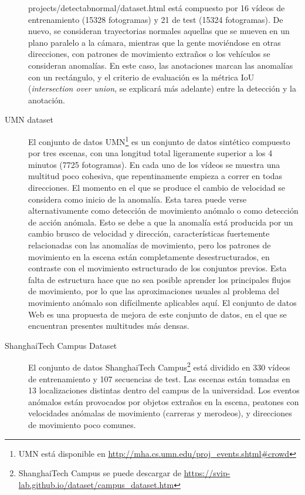 \documentclass[../main.tex]{memoir}
\begin{document}
\begin{description}
{{      projects/detectabnormal/dataset.html}} \cite{lu2013abnormal}
  está compuesto por 16 vídeos de entrenamiento (15328 fotogramas) y
  21 de test (15324 fotogramas). De nuevo, se consideran trayectorias
  normales aquellas que se mueven en un plano paralelo a la cámara,
  mientras que la gente moviéndose en otras direcciones, con patrones
  de movimiento extraños o los vehículos se consideran anomalías. En
  este caso, las anotaciones marcan las anomalías con un rectángulo, y
  el criterio de evaluación es la métrica IoU (\textit{intersection
    over union}, se explicará más adelante) entre la detección y la
  anotación.
\item[UMN dataset] El conjunto de datos UMN\footnote{UMN está
    disponible en \url{http://mha.cs.umn.edu/proj\_events.shtml\#crowd}}
  es un conjunto de datos sintético compuesto por tres escenas, con
  una longitud total ligeramente superior a los 4 minutos (7725
  fotogramas). En cada uno de los vídeos se muestra una multitud poco
  cohesiva, que repentinamente empieza a correr en todas direcciones.
  El momento en el que se produce el cambio de velocidad se considera
  como inicio de la anomalía. Esta tarea puede verse alternativamente
  como detección de movimiento anómalo o como detección de acción
  anómala. Esto se debe a que la anomalía está producida por un cambio
  brusco de velocidad y dirección, características fuertemente
  relacionadas con las anomalías de movimiento, pero los patrones de
  movimiento en la escena están completamente desestructurados, en
  contraste con el movimiento estructurado de los conjuntos previos.
  Esta falta de estructura hace que no sea posible aprender los
  principales flujos de movimiento, por lo que las aproximaciones
  usuales al problema del movimiento anómalo son difícilmente
  aplicables aquí. El conjunto de datos Web \cite{mehran2009abnormal}
  es una propuesta de mejora de este conjunto de datos, en el que se
  encuentran presentes multitudes más densas.
\item[ShanghaiTech Campus Dataset] El conjunto de datos ShanghaiTech
  Campus\footnote{ShanghaiTech Campus se puede descargar de
    \url{https://svip-lab.github.io/dataset/campus_dataset.htm}}
  \cite{liu2018future} está dividido en 330 vídeos de entrenamiento y
  107 secuencias de test. Las escenas están tomadas en 13
  localizaciones distintas dentro del campus de la universidad. Los
  eventos anómalos están provocados por objetos extraños en la escena,
  peatones con velocidades anómalas de movimiento (carreras y
  merodeos), y direcciones de movimiento poco comunes.
\end{description}
\end{document}
